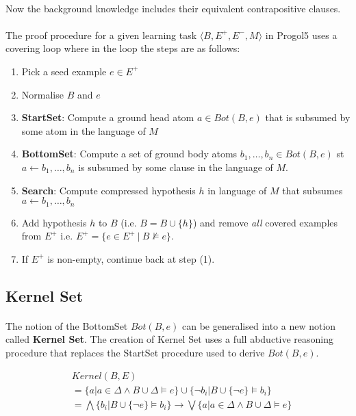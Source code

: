 \documentclass{article}
\theoremstyle{plain}
\theoremstyle{definition}
\begin{document}
\begin{multicols}{2}
\paragraph{} Now the background knowledge includes their equivalent contrapositive clauses.

\paragraph{} The proof procedure for a given learning task $\langle B, E^+, E^-, M\rangle$ in Progol5 uses a covering loop where in the loop the steps are as follows:

\begin{enumerate}
\item Pick a seed example $e \in E^+$
\item Normalise $B$ and $e$
\item \textbf{StartSet}: Compute a ground head atom $a \in Bot(B, e)$ that is subsumed by some atom in the language of $M$
\item \textbf{BottomSet}: Compute a set of ground body atoms $b_1, \dots, b_n \in Bot(B, e)$ st $a \leftarrow b_1,\dots,b_n$ is subsumed by some clause in the language of $M$.
\item \textbf{Search}: Compute compressed hypothesis $h$ in language of $M$ that subsumes $a \leftarrow b_1, \dots, b_n$
\item Add hypothesis $h$ to $B$ (i.e. $B = B \cup \{h\}$) and remove \textit{all} covered examples from $E^+$ i.e. $E^+ = \{e \in E^+\ |\ B \not\models e\}$.
\item If $E^+$ is non-empty, continue back at step (1).
\end{enumerate}

\subsection{Kernel Set}

\paragraph{} The notion of the BottomSet $Bot(B, e)$ can be generalised into a new notion called \textbf{Kernel Set}. The creation of Kernel Set uses a full abductive reasoning procedure that replaces the StartSet procedure used to derive $Bot(B, e)$. 

{\footnotesize
\begin{align*}
& Kernel(B, E) \\
&= \{a | a \in \Delta \land B \cup \Delta \models e\} \cup \{\lnot b_i | B \cup \{\lnot e\} \models b_i\} \\
&= \bigwedge \{b_i | B \cup \{\lnot e\} \models b_i\} \rightarrow \bigvee \{a | a \in \Delta \land B \cup \Delta \models e\}
\end{align*}}


\end{multicols}
\end{document}
